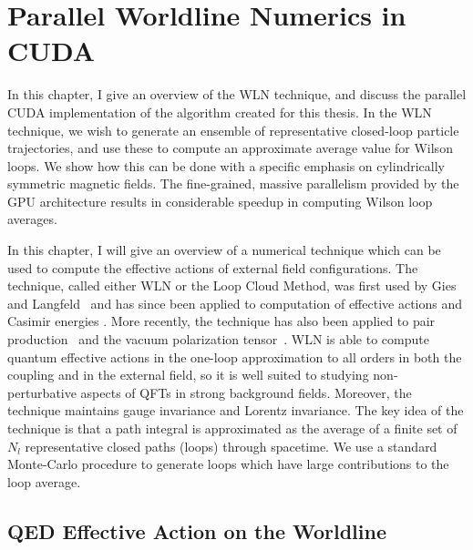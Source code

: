 \chapter{Parallel Worldline Numerics in \texorpdfstring{\acs{CUDA}}{CUDA}} 

\label{ch:WLNumerics}

\acresetall

\begin{summary}
	In this chapter, I give an overview of the \ac{WLN} 
	technique, and discuss the parallel 
	\ac{CUDA} implementation of the algorithm created for this 
	thesis. In the \ac{WLN} technique, we wish to 
	generate an ensemble of representative closed-loop particle 
	trajectories, and use these to compute an approximate 
	average value for Wilson loops. We show how this can be done with 
	a specific emphasis on cylindrically symmetric magnetic fields.
	The fine-grained, massive parallelism provided by 
	the \ac{GPU} architecture results in considerable speedup in 
	computing Wilson loop averages.
\end{summary}

In this chapter, I will give an overview of a numerical technique 
which can be used to compute the effective actions of external 
field configurations.
The technique, called either \acl{WLN} or the Loop Cloud Method,
was first used by Gies and Langfeld~\cite{Gies:2001zp} and has since been
applied to computation of effective actions 
\cite{Gies:2001tj,Langfeld:2002vy,Gies:2005sb,Gies:2005ym,Dunne:2009zz}
and Casimir energies
\cite{Moyaerts:2003ts,Gies:2003cv,PhysRevLett.96.220401}. More recently, 
the technique has also been applied to pair production~\cite{2005PhRvD..72f5001G}
and the vacuum polarization tensor~\cite{PhysRevD.84.065035}.
\ac{WLN} is able to compute quantum effective actions in
the one-loop approximation to all orders in both the coupling and in the
external field, so it is well suited to studying non-perturbative aspects
of \acp{QFT} in strong background fields. Moreover, the technique maintains
gauge invariance and Lorentz invariance.  The key idea of the technique is
that a path integral is approximated as the average of a finite set of $N_l$
representative closed paths (loops) through spacetime. We use a standard
Monte-Carlo procedure to generate loops which have large contributions to
the loop average.


\section{\texorpdfstring{\acs{QED}}{QED} Effective Action on the Worldline}


